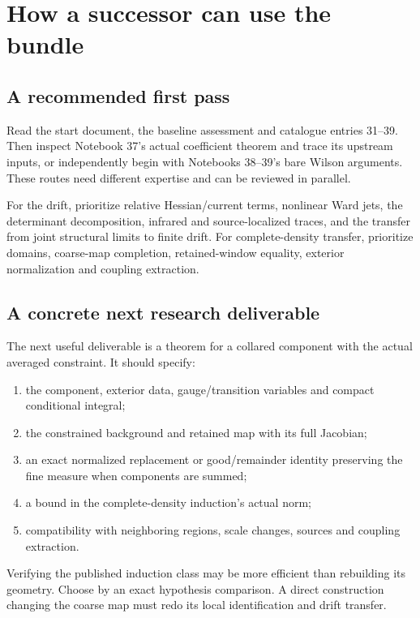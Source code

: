 \section{How a successor can use the bundle}
\label{hdc-continuation}

\subsection{A recommended first pass}

Read the start document, the baseline assessment
and catalogue entries 31--39. Then inspect
Notebook 37's actual coefficient theorem and
trace its upstream inputs, or independently
begin with Notebooks 38--39's bare Wilson
arguments. These routes need different
expertise and can be reviewed in parallel.

For the drift, prioritize relative
Hessian/current terms, nonlinear Ward jets,
the determinant decomposition, infrared and
source-localized traces, and the transfer from
joint structural limits to finite drift.
For complete-density transfer, prioritize
domains, coarse-map completion, retained-window
equality, exterior normalization and coupling
extraction.

\subsection{A concrete next research deliverable}

The next useful deliverable is a theorem for a
collared component with the actual averaged
constraint. It should specify:
\begin{enumerate}
\item the component, exterior data,
gauge/transition variables and compact
conditional integral;
\item the constrained background and retained
map with its full Jacobian;
\item an exact normalized replacement or
good/remainder identity preserving the fine
measure when components are summed;
\item a bound in the complete-density
induction's actual norm;
\item compatibility with neighboring regions,
scale changes, sources and coupling extraction.
\end{enumerate}

Verifying the published induction class may
be more efficient than rebuilding its
geometry. Choose by an exact hypothesis
comparison. A direct construction changing
the coarse map must redo its local
identification and drift transfer.


